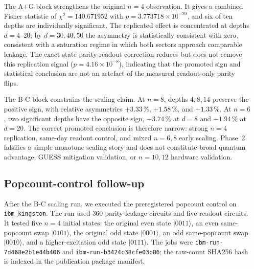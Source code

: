 \documentclass[reprint,aps,physrev,superscriptaddress,floatfix,longbibliography]{revtex4-2}
\begin{document}
The A+G block strengthens the original $n=4$ observation. It gives a
combined Fisher statistic of $\chi^2=140.671952$ with
$p=3.773718\times10^{-20}$, and six of ten depths are individually
significant. The replicated effect is concentrated at depths
$d=4$--20; by $d=30,40,50$ the asymmetry is statistically consistent
with zero, consistent with a saturation regime in which both sectors
approach comparable leakage. The exact-state parity-readout
correction reduces but does not remove this replication signal
($p=4.16\times10^{-8}$), indicating that the promoted sign and
statistical conclusion are not an artefact of the measured readout-only
parity flips.

The B-C block constrains the scaling claim. At $n=8$, depths
$4,8,14$ preserve the positive sign, with relative asymmetries
$+3.33\,\%$, $+1.58\,\%$, and $+1.33\,\%$. At $n=6$, two significant
depths have the opposite sign, $-3.74\,\%$ at $d=8$ and $-1.94\,\%$
at $d=20$. The correct promoted conclusion is therefore narrow:
strong $n=4$ replication, same-day readout control, and mixed
$n=6,8$ early scaling. Phase~2 falsifies a simple monotone scaling
story and does not constitute broad quantum advantage, GUESS
mitigation validation, or $n=10,12$ hardware validation.

\subsection{Popcount-control follow-up}
\label{sec:popcount}

After the B-C scaling run, we executed the preregistered popcount
control on \texttt{ibm\_kingston}. The run used 360 parity-leakage
circuits and five readout circuits. It tested five $n=4$ initial
states: the original even state $|0011\rangle$, an even same-popcount
swap $|0101\rangle$, the original odd state $|0001\rangle$, an odd
same-popcount swap $|0010\rangle$, and a higher-excitation odd state
$|0111\rangle$. The jobs were
\texttt{ibm-run-7d468e2b1e44b406} and
\texttt{ibm-run-b3424c38cfe03c86}; the raw-count SHA256 hash is indexed
in the publication package manifest.
\end{document}
